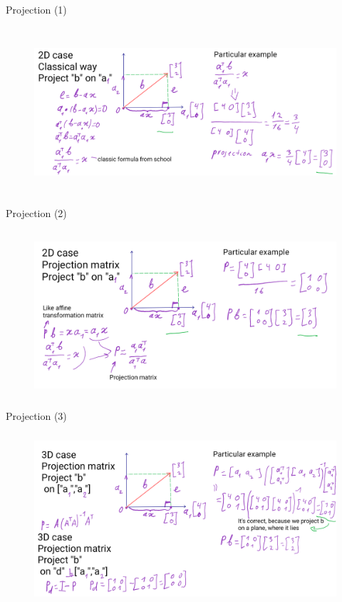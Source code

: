 \documentclass[aspectratio=169]{beamer}
\begin{document}
\begin{frame}[t]{Projection (1)}
\framesubtitle{}
    \begin{figure}[H]
        \centering\includegraphics[height=6cm,width=1\textwidth,keepaspectratio]{Заметка2_1.png}
        \label{fig:Заметка2_1.png}
    \end{figure}
\end{frame}

\begin{frame}[t]{Projection (2)}
    \framesubtitle{}
        \begin{figure}[H]
            \centering\includegraphics[height=6cm,width=1\textwidth,keepaspectratio]{Заметка2_2.png}
            \label{fig:Заметка2_2.png}
        \end{figure}
    \end{frame}

    \begin{frame}[t]{Projection (3)}
        \framesubtitle{}
            \begin{figure}[H]
                \centering\includegraphics[height=6cm,width=1\textwidth,keepaspectratio]{Заметка2_3.png}
                \label{fig:Заметка2_3.png}
            \end{figure}
        \end{frame}
\end{document}
